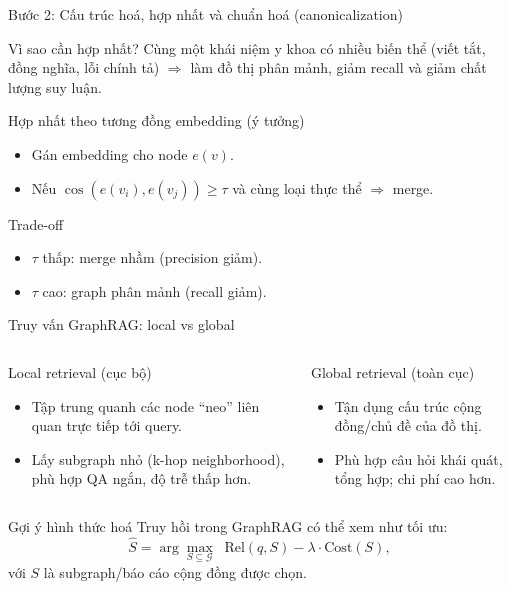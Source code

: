 \documentclass[aspectratio=169,10pt]{beamer}
\newcommand{\G}{\mathcal{G}}
\begin{document}
\begin{frame}{Bước 2: Cấu trúc hoá, hợp nhất và chuẩn hoá (canonicalization)}
\small
\begin{block}{Vì sao cần hợp nhất?}
Cùng một khái niệm y khoa có nhiều biến thể (viết tắt, đồng nghĩa, lỗi chính tả) \(\Rightarrow\) làm đồ thị phân mảnh, giảm recall và giảm chất lượng suy luận.
\end{block}

\begin{block}{Hợp nhất theo tương đồng embedding (ý tưởng)}
\begin{itemize}
  \item Gán embedding cho node \(e(v)\).
  \item Nếu \(\cos(e(v_i), e(v_j)) \ge \tau\) và cùng loại thực thể \(\Rightarrow\) merge.
\end{itemize}
\end{block}

\begin{block}{Trade-off}
\begin{itemize}
  \item \(\tau\) thấp: merge nhầm (precision giảm).
  \item \(\tau\) cao: graph phân mảnh (recall giảm).
\end{itemize}
\end{block}
\end{frame}

\begin{frame}{Truy vấn GraphRAG: local vs global}
\small
\begin{columns}[T,onlytextwidth]
\begin{block}{Local retrieval (cục bộ)}
\begin{itemize}
  \item Tập trung quanh các node ``neo'' liên quan trực tiếp tới query.
  \item Lấy subgraph nhỏ (k-hop neighborhood), phù hợp QA ngắn, độ trễ thấp hơn.
\end{itemize}
\end{block}

\begin{block}{Global retrieval (toàn cục)}
\begin{itemize}
  \item Tận dụng cấu trúc cộng đồng/chủ đề của đồ thị.
  \item Phù hợp câu hỏi khái quát, tổng hợp; chi phí cao hơn.
\end{itemize}
\end{block}
\end{columns}

\vspace{0.15cm}
\begin{block}{Gợi ý hình thức hoá}
Truy hồi trong GraphRAG có thể xem như tối ưu:
\[
\hat{S}=\arg\max_{S\subseteq \G} \;\; \text{Rel}(q,S) - \lambda\cdot \text{Cost}(S),
\]
với \(S\) là subgraph/báo cáo cộng đồng được chọn.
\end{block}
\end{frame}
\end{document}
